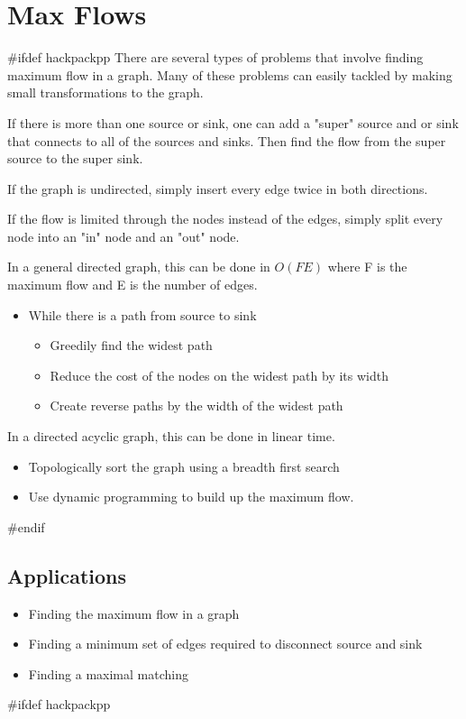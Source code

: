 \section{Max Flows}
#ifdef hackpackpp
There are several types of problems that involve finding maximum flow in a graph.
Many of these problems can easily tackled by making small transformations to the graph.


If there is more than one source or sink, one can add a "super" source and or sink that connects to all of the sources and sinks.
Then find the flow from the super source to the super sink.


If the graph is undirected, simply insert every edge twice in both directions.


If the flow is limited through the nodes instead of the edges, simply split every node into an "in" node and an "out" node.

In a general directed graph, this can be done in $O(FE)$ where F is the maximum flow and E is the number of edges.
\begin{itemize}
	\item While there is a path from source to sink
	\begin{itemize}
		\item Greedily find the widest path
		\item Reduce the cost of the nodes on the widest path by its width
		\item Create reverse paths by the width of the widest path
	\end{itemize}
\end{itemize}

In a directed acyclic graph, this can be done in linear time.

\begin{itemize}
	\item Topologically sort the graph using a breadth first search
	\item Use dynamic programming to build up the maximum flow.
\end{itemize}
#endif

\subsection{Applications}
\begin{itemize}
	\item Finding the maximum flow in a graph
	\item Finding a minimum set of edges required to disconnect source and sink
	\item Finding a maximal matching
\end{itemize}
#ifdef hackpackpp

